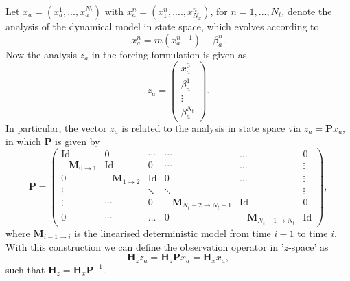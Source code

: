 \documentclass[a4paper,10pt]{article}
\numberwithin{equation}{section}
\begin{document}
Let $x_a=(x_a^1,...,x_a^{N_t})$ with $x_a^n=(x_1^n,....,x_{N_x}^n)$, for $n=1,...,N_t$, denote the analysis of the dynamical model in state space, which evolves according to
\begin{equation}
x_a^n = m(x_a^{n-1}) + \beta_a^n.
\end{equation}
Now the analysis $z_a$ in the forcing formulation is given as 
\begin{equation}
z_a = 
\begin{pmatrix}
x^0_a\\
\beta^1_a\\
\vdots\\
\beta_a^{N_t}
\end{pmatrix}.
\end{equation}
In particular, the vector $z_a$ is related to the analysis in state space via $z_a = \mathbf Px_a$, in which $\mathbf P$ is given by
\begin{equation}
\mathbf P = 
\begin{pmatrix}
\text{Id} & 0 & \cdots &\cdots & \hdots&0 \\
-\mathbf M_{0\to 1} & \text{Id} & 0 & \cdots &\hdots& \vdots\\
0&-\mathbf M_{1\to 2}&\text{Id}&0&\hdots&\vdots\\
\vdots &  & \ddots & \ddots&&\vdots\\
\vdots& \cdots & 0& -\mathbf M_{N_t-2\to N_t-1} &\text{Id}& 0\\
0 & \cdots &\hdots& 0 & -\mathbf M_{N_t-1\to N_t} & \text{Id}
\end{pmatrix},
\end{equation}
where $\mathbf M_{i-1\to i}$ is the linearised deterministic model from time $i-1$ to time $i$. With this construction we can define the observation operator in '$z$-space' as 
\begin{equation}
\mathbf H_z z_a = \mathbf H_z \mathbf P x_a = \mathbf H_x x_a,
\end{equation}
such that $\mathbf H_z = \mathbf H_x \mathbf P^{-1}$.
\end{document}
